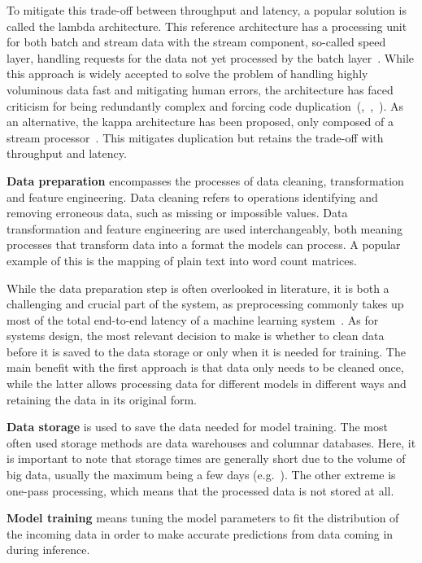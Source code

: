 To mitigate this trade-off between throughput and latency, a popular solution is called the lambda architecture. This reference architecture has a processing unit for both batch and stream data with the stream component, so-called speed layer, handling requests for the data not yet processed by the batch layer~\cite{beatingcap}. While this approach is widely accepted to solve the problem of handling highly voluminous data fast and mitigating human errors, the architecture has faced criticism for being redundantly complex and forcing code duplication~(\cite{questioninglambda},~\cite{uber},~\cite{facebook}). As an alternative, the kappa architecture has been proposed, only composed of a stream processor~\cite{questioninglambda}. This mitigates duplication but retains the trade-off with throughput and latency.

\textbf{Data preparation} encompasses the processes of data cleaning, transformation and feature engineering. Data cleaning refers to operations identifying and removing erroneous data, such as missing or impossible values. Data transformation and feature engineering are used interchangeably, both meaning processes that transform data into a format the models can process. A popular example of this is the mapping of plain text into word count matrices.

While the data preparation step is often overlooked in literature,
it is both a challenging and crucial part of the system, as preprocessing commonly takes up most of the total end-to-end latency of a machine learning system~\cite{adaptivelearningsystems}. As for systems design, the most relevant decision to make is whether to clean data before it is saved to the data storage or only when it is  needed for training. The main benefit with the first approach is that data only needs to be cleaned once, while the latter allows processing data for different models in different ways and retaining the data in its original form.

\textbf{Data storage} is used to save the data needed for model training. The most often used storage methods are data warehouses and columnar databases. Here, it is important to note that storage times are generally short due to the volume of big data, usually the maximum being a few days (e.g.~\cite{uber}). The other extreme is one-pass processing, which means that the processed data is not stored at all.

\textbf{Model training} means tuning the model parameters to fit the distribution of the incoming data in order to make accurate predictions from data coming in during inference.

